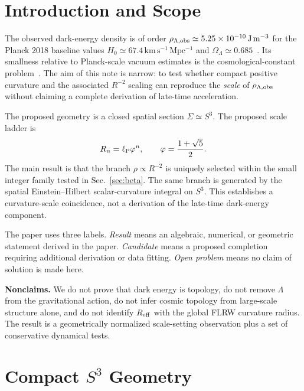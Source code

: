 \documentclass[11pt,a4paper]{article}
\newcommand{\vph}{\varphi}
\newcommand{\ellP}{\ell_{\rm P}}
\newcommand{\rhoL}{\rho_{\Lambda,{\rm obs}}}
\newcommand{\Reff}{R_{\rm eff}}
\newcommand{\OmL}{\Omega_\Lambda}
\begin{document}
\tableofcontents
\newpage

\section{Introduction and Scope}
\label{sec:intro}

The observed dark-energy density is of order
$\rhoL\simeq5.25\times10^{-10}\,\mathrm{J\,m^{-3}}$ for the Planck 2018
baseline values $H_0\simeq67.4\,\mathrm{km\,s^{-1}\,Mpc^{-1}}$ and
$\OmL\simeq0.685$~\cite{Planck2018}.  Its smallness relative to Planck-scale
vacuum estimates is the cosmological-constant problem~\cite{Wald1984}.
The aim of this note is narrow: to test whether compact positive curvature and
the associated $R^{-2}$ scaling can reproduce the \emph{scale} of $\rhoL$ without
claiming a complete derivation of late-time acceleration.

The proposed geometry is a closed spatial section $\Sigma\simeq S^3$.
The proposed scale ladder is
\begin{equation}
R_n=\ellP\vph^n,\qquad \vph=\frac{1+\sqrt5}{2}.
\end{equation}
The main result is that the branch $\rho\propto R^{-2}$ is uniquely selected
within the small integer family tested in Sec.~\ref{sec:beta}.  The same branch
is generated by the spatial Einstein--Hilbert scalar-curvature integral on $S^3$.
This establishes a curvature-scale coincidence, not a derivation of the
late-time dark-energy component.

\begin{defbox}
The paper uses three labels.  \emph{Result} means an algebraic, numerical, or
geometric statement derived in the paper.  \emph{Candidate} means a proposed
completion requiring additional derivation or data fitting.  \emph{Open problem}
means no claim of solution is made here.
\end{defbox}

\textbf{Nonclaims.}  We do not prove that dark energy is topology, do not remove
$\Lambda$ from the gravitational action, do not infer cosmic topology from
large-scale structure alone, and do not identify $\Reff$ with the global FLRW
curvature radius.  The result is a geometrically normalized scale-setting observation plus a set of
conservative dynamical tests.

\section{Compact \texorpdfstring{$S^3$}{S3} Geometry}
\label{sec:geom}
\end{document}
